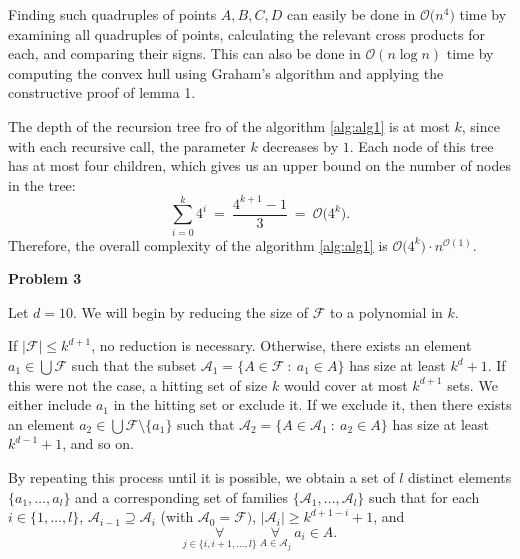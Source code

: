 \documentclass[12pt]{article}
\begin{document}
	Finding such quadruples of points \(A, B, C, D\) can easily be done in
	\(\mathcal{O} \big( n^{4} \big)\) time by examining all quadruples of
	points, calculating the relevant cross products for each, and comparing
	their signs. This can also be done in \(\mathcal{O} (n \log n)\) time by
	computing the convex hull using Graham's algorithm and applying the
	constructive proof of lemma 1.
	
	\medskip
	
	The depth of the recursion tree fro of the algorithm \ref{alg:alg1} is at
	most \(k\), since with each recursive call, the parameter \(k\) decreases
	by \(1\). Each node of this tree has at most four children, which gives us
	an upper bound on the number of nodes in the tree:
	\[ \sum\limits_{i = 0}^{k} 4^{i} \ = \ \frac{4^{k + 1} - 1}{3} \ = \
	\mathcal{O} \big( 4^{k} \big) \text{.} \]
	Therefore, the overall complexity of the algorithm \ref{alg:alg1} is
	\(\mathcal{O} \big( 4^{k} \big) \cdot n^{\mathcal{O}(1)}\).
	
	\bigskip
	
	\textbf{Problem 3}
	
	\medskip
	
	Let \(d = 10\). We will begin by reducing the size of \(\mathcal{F}\) to a
	polynomial in \(k\).
	
	\medskip
	
	If \(|\mathcal{F}| \leqslant k^{d + 1}\), no reduction is necessary.
	Otherwise, there exists an element \(a_{1} \in \bigcup \mathcal{F}\) such
	that the subset \(\mathcal{A}_{1} = \{A \in \mathcal{F} \ : \ a_{1} \in
	A\}\) has size at least \(k^{d} + 1\). If this were not the case, a hitting
	set of size \(k\) would cover at most \(k^{d + 1}\) sets. We either include
	\(a_{1}\) in the hitting set or exclude it. If we exclude it, then there
	exists an element \(a_{2} \in \bigcup \mathcal{F} \setminus \{a_{1}\}\) such
	that \(\mathcal{A}_{2} = \{A \in \mathcal{A}_{1} \ : \ a_{2} \in A\}\) has
	size at least \(k^{d - 1} + 1\), and so on.
	
	\medskip
	
	By repeating this process until it is possible, we obtain a set of \(l\)
	distinct elements \(\{a_{1}, \ldots, a_{l}\}\) and a corresponding set of
	families \(\{\mathcal{A}_{1}, \ldots, \mathcal{A}_{l}\}\) such that for each
	\(i \in \{1, \ldots, l\}\), \(\mathcal{A}_{i - 1} \supseteq
	\mathcal{A}_{i}\) (with \(\mathcal{A}_{0} = \mathcal{F})\),
	\(|\mathcal{A}_{i}| \geqslant k^{d + 1 - i} + 1\), and
	\[ \underset{j \in \{i, i + 1, \ldots, l\}}{\forall} \
	\underset{A \in \mathcal{A}_{j}}{\forall} \ a_{i} \in A \text{.} \]
	
\end{document}
